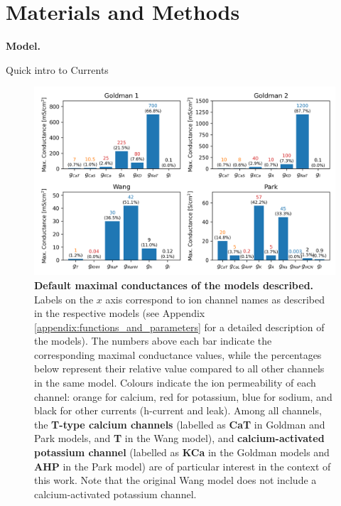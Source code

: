 \documentclass[../main.tex]{subfiles}
\begin{document}
\section{Materials and Methods} \label{sec:materials_and_methods}

\noindent\textbf{Model.}

Quick intro to Currents

\begin{figure}[H]
    \centering
    \includegraphics[width=\linewidth]{../img/materials_and_methods/model_conductances.png}
    \caption[Default maximal conductances of the models described]{
        \textbf{Default maximal conductances of the models described.} Labels on the $x$ axis correspond to ion channel names as described in the respective models (see Appendix \ref{appendix:functions_and_parameters} for a detailed description of the models).
        The numbers above each bar indicate the corresponding maximal conductance values, while the percentages below represent their relative value compared to all other channels in the same model.
        Colours indicate the ion permeability of each channel: orange for calcium, red for potassium, blue for sodium, and black for other currents (h-current and leak).
        Among all channels, the \textbf{T-type calcium channels} (labelled as \textbf{CaT} in Goldman and Park models, and \textbf{T} in the Wang model), and \textbf{calcium-activated potassium channel} (labelled as \textbf{KCa} in the Goldman models and \textbf{AHP} in the Park model) are of particular interest in the context of this work. Note that the original Wang model does not include a calcium-activated potassium channel.
    }
    \label{fig:model_conductances}
\end{figure}
\end{document}
